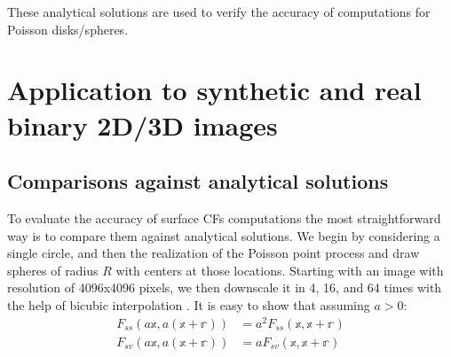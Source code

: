 \documentclass[reprint,amsmath,amssymb,aps,pre]{revtex4-1}
\begin{document}
These analytical solutions are used to verify the accuracy of computations for
Poisson disks/spheres.

\section{Application to synthetic and real binary 2D/3D images}
\label{sec:results}
\subsection{Comparisons against analytical solutions}
To evaluate the accuracy of surface CFs computations the most straightforward
way is to compare them against analytical solutions. We begin by considering a
single circle, and then the realization of the Poisson point process and draw
spheres of radius $R$ with centers at those locations. Starting with an image
with resolution of 4096x4096 pixels, we then downscale it in 4, 16, and 64 times
with the help of bicubic interpolation \cite{mexicans}. It is easy to show that
assuming $a > 0$:
\begin{align*}
  F_{ss}(a \mathbb{x}, a(\mathbb{x} + \mathbb{r})) &= a^2 F_{ss}(\mathbb{x},
  \mathbb{x} + \mathbb{r}) \\
  F_{sv}(a \mathbb{x}, a(\mathbb{x} + \mathbb{r})) &= a F_{sv}(\mathbb{x},
  \mathbb{x} + \mathbb{r})
\end{align*}
\end{document}
